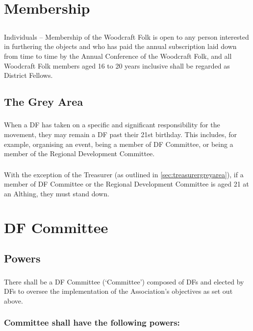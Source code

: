 \documentclass[a4paper, 12pt]{article}
\begin{document}
\section{Membership}
\subsection{}
\label{sec:membership}
Individuals -- Membership of the Woodcraft Folk is open to any person interested in furthering the objects and who has paid the annual subscription laid down from time to time by the Annual Conference of the Woodcraft Folk, and all Woodcraft Folk members aged 16 to 20 years inclusive shall be regarded as District Fellows.
\subsection{The Grey Area}
\label{sec:greyarea}
\subsubsection{}
When a DF has taken on a specific and significant responsibility for the movement, they may remain a DF past their 21st birthday. This includes, for example, organising an event, being a member of DF Committee, or being a member of the Regional Development Committee.
\subsubsection{}
With the exception of the Treasurer (as outlined in \ref{sec:treasurergreyarea}), if a member of DF Committee or the Regional Development Committee is aged 21 at an Althing, they must stand down.

\section{DF Committee}
\subsection{Powers}
\subsubsection{}
There shall be a DF Committee (`Committee') composed of DFs and elected by DFs to oversee the implementation of the Association’s objectives as set out above.

\subsubsection{Committee shall have the following powers:}
\end{document}
